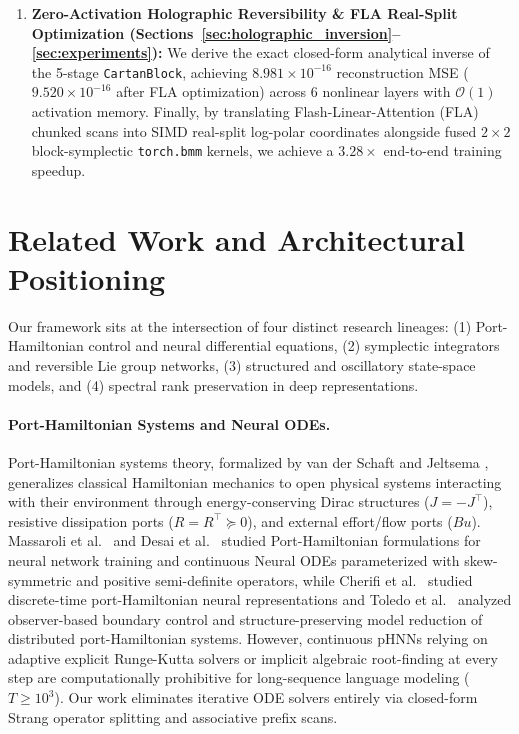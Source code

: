 \documentclass[11pt,a4paper]{article}
\begin{document}
\begin{enumerate}
    \item \textbf{Zero-Activation Holographic Reversibility \& FLA Real-Split Optimization (Sections~\ref{sec:holographic_inversion}--\ref{sec:experiments}):} We derive the exact closed-form analytical inverse of the 5-stage \texttt{CartanBlock}, achieving $8.981\times 10^{-16}$ reconstruction MSE ($9.520\times 10^{-16}$ after FLA optimization) across 6 nonlinear layers with $\mathcal{O}(1)$ activation memory. Finally, by translating Flash-Linear-Attention (FLA) \cite{yang2024fla} chunked scans into SIMD real-split log-polar coordinates alongside fused $2\times 2$ block-symplectic \texttt{torch.bmm} kernels, we achieve a $3.28\times$ end-to-end training speedup.
\end{enumerate}

\section{Related Work and Architectural Positioning}
\label{sec:related_work}

Our framework sits at the intersection of four distinct research lineages: (1) Port-Hamiltonian control and neural differential equations, (2) symplectic integrators and reversible Lie group networks, (3) structured and oscillatory state-space models, and (4) spectral rank preservation in deep representations.

\paragraph{Port-Hamiltonian Systems and Neural ODEs.}
Port-Hamiltonian systems theory, formalized by van der Schaft and Jeltsema \cite{vanderschaft2014porthamiltonian}, generalizes classical Hamiltonian mechanics to open physical systems interacting with their environment through energy-conserving Dirac structures ($J = -J^\top$), resistive dissipation ports ($R = R^\top \succeq 0$), and external effort/flow ports ($B u$). Massaroli et al.\ \cite{massaroli2019porthamiltonian,massaroli2020dissecting} and Desai et al.\ \cite{desai2021porthamiltonian} studied Port-Hamiltonian formulations for neural network training and continuous Neural ODEs parameterized with skew-symmetric and positive semi-definite operators, while Cherifi et al.\ \cite{cherifi2022discrete} studied discrete-time port-Hamiltonian neural representations and Toledo et al.\ \cite{toledo2020observer,toledo2024structure} analyzed observer-based boundary control and structure-preserving model reduction of distributed port-Hamiltonian systems. However, continuous pHNNs relying on adaptive explicit Runge-Kutta solvers or implicit algebraic root-finding at every step are computationally prohibitive for long-sequence language modeling ($T \ge 10^3$). Our work eliminates iterative ODE solvers entirely via closed-form Strang operator splitting and associative prefix scans.
\end{document}
